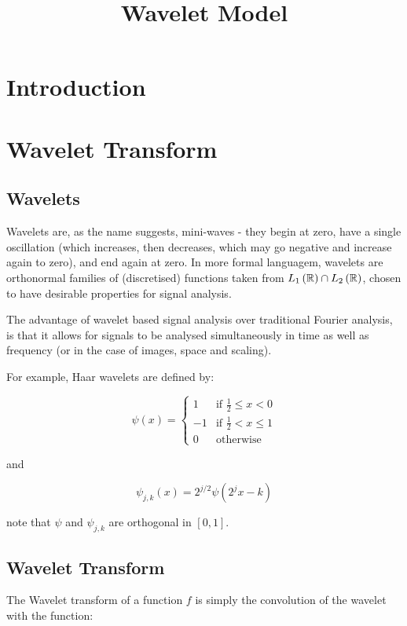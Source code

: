\documentclass{article}
\title{Wavelet Model}
\begin{document}
\maketitle

\section{Introduction}

\section{Wavelet Transform}

\subsection{Wavelets}
Wavelets are, as the name suggests, mini-waves - they begin at zero, have a single oscillation (which increases, then decreases, which may go negative and increase again to zero), and end again at zero. In more formal languagem, wavelets are orthonormal families of (discretised) functions taken from \(L_1\left({\mathbb{R}}\right) \cap L_2\left({\mathbb{R}}\right)\), chosen to have desirable properties for signal analysis. 

The advantage of wavelet based signal analysis over traditional Fourier analysis, is that it allows for signals to be analysed simultaneously in time as well as frequency (or in the case of images, space and scaling). 

For example, Haar wavelets are defined by:

\begin{equation}
\psi\left(x\right) =
\begin{cases}
 1 & \text{if } \frac{1}{2} \leq	x < 0 \\
-1 & \text{if } \frac{1}{2} <  x \leq 1 \\
0 & \text{otherwise} 
\end{cases}
\end{equation}

and 

\begin{equation}
\psi_{j,k}\left(x\right) = 2^{j/2}\psi\left(2^j x - k\right)
\end{equation}

note that \(\psi\) and \(\psi_{j,k}\) are orthogonal in \([0,1]\). 

\subsection{Wavelet Transform}
The Wavelet transform of a function \(f\) is simply the convolution of the wavelet with the function:
\end{document}
